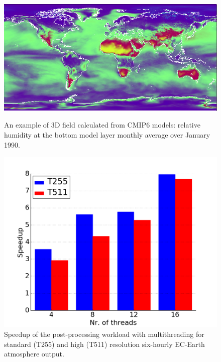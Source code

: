 \documentclass[procedia]{easychair}
\begin{document}
\begin{figure}[h]
\centering
\begin{minipage}[b]{.45\textwidth}
  \centering
   \vspace*{1.5cm}
 \includegraphics[width=1\textwidth]{hur.png}
 \caption{An example of 3D field calculated from CMIP6 models: relative 
humidity at the bottom model layer monthly average over January 1990.}
\label{fig:hum}
\end{minipage}%
\hspace{0.6cm}
\begin{minipage}[b]{.45\textwidth}
  \centering
 \includegraphics[width=1\textwidth]{speedup_chart.png}
  \vspace*{-0.75cm}
 \caption{Speedup of the post-processing workload with multithreading for 
standard (T255) and high (T511) resolution six-hourly EC-Earth atmosphere 
output.}
\label{fig:speedup}
\end{minipage}
\end{figure}
\end{document}
